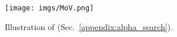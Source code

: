 \begin{figure}[t!]
{
\centering
    \texttt{[image: imgs/MoV.png]}
    \caption{Illustration of \sr{} (Sec.~\ref{appendix:alpha_search}).}
    \label{fig:mov}
}
\end{figure}